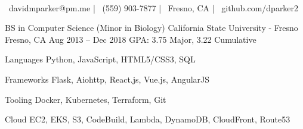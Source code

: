 \documentclass[]{awesome-cv}
\begin{document}
    
\begin{center}
	  \\
	\vspace{2mm}
	{\faEnvelope\ davidmparker@pm.me} | {\faMobile\ (559) 903-7877} | {\faMapMarker\ Fresno, CA} | {\faLink\ github.com/dparker2}
\end{center}
\begin{cventries}
	\cventry
	{BS in Computer Science (Minor in Biology)}
	{California State University - Fresno}
	{Fresno, CA}
	{Aug 2013 – Dec 2018}
	{GPA: 3.75 Major, 3.22 Cumulative}
\end{cventries}

\vspace{-2mm}
\begin{cvskills}
	\cvskill
	{Languages}
	{Python, JavaScript, HTML5/CSS3, SQL}

	\cvskill
	{Frameworks}
	{Flask, Aiohttp, React.js, Vue.js, AngularJS}

	\cvskill
	{Tooling}
	{Docker, Kubernetes, Terraform, Git}

	\cvskill
	{Cloud}
	{EC2, EKS, S3, CodeBuild, Lambda, DynamoDB, CloudFront, Route53}
\end{cvskills}
\end{document}
